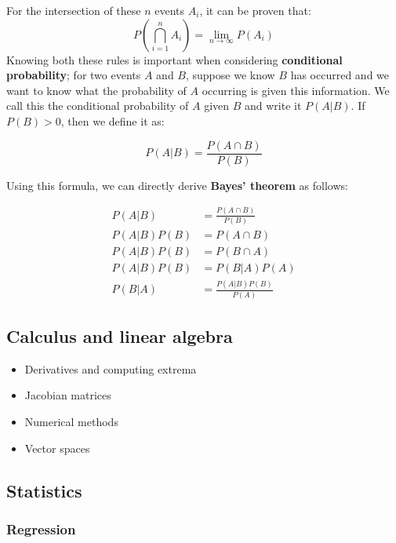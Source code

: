 For the intersection of these $n$ events $A_i$, it can be proven that:
\begin{equation}
  P(\bigcap_{i=1}^n A_i) = \lim_{n \to \infty} P(A_i)
\end{equation}
Knowing both these rules is important when considering
\textbf{conditional probability}; for two events $A$ and $B$, suppose
we know $B$ has occurred and we want to know what the probability of
$A$ occurring is given this information. We call this the conditional
probability of $A$ given $B$ and write it $P(A|B)$. If $P(B) > 0$,
then we define it as:

\begin{equation}
  P(A|B) = \frac{P(A \cap B)}{P(B)}
\end{equation}

Using this formula, we can directly derive \textbf{Bayes' theorem} as follows:

\begin{equation}
  \begin{aligned}
    P(A|B) &= \frac{P(A \cap B)}{P(B)} \\
    P(A|B) P(B) &= P(A \cap B)\\
    P(A|B) P(B) &= P(B \cap A)\\
    P(A|B) P(B) &= P(B|A) P(A)\\
    P(B|A) &= \frac{P(A|B) P(B)}{P(A)}
  \end{aligned}
\end{equation}

\subsection{Calculus and linear algebra}
\label{sec:calculus}
\begin{itemize}
\item Derivatives and computing extrema
\item Jacobian matrices
\item Numerical methods
\item Vector spaces
\end{itemize}

\subsection{Statistics}
\label{sec:statistics}
    \subsubsection{Regression}

